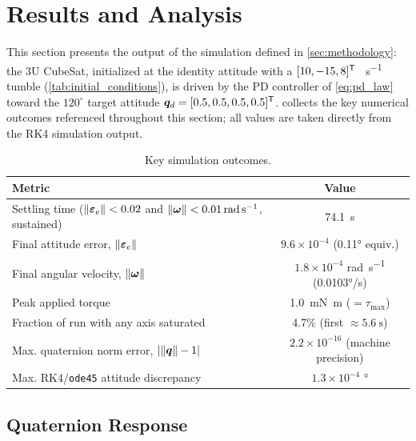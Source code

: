 \section{Results and Analysis}
\label{sec:results}

This section presents the output of the simulation defined in \cref{sec:methodology}: the 3U CubeSat, initialized at the identity attitude with a $[10,-15,8]^{\mathsf{T}}$ \si{\deg\per\second} tumble (\cref{tab:initial_conditions}), is driven by the PD controller of \cref{eq:pd_law} toward the $120^\circ$ target attitude $\bm{q}_d=[0.5,0.5,0.5,0.5]^{\mathsf{T}}$.  collects the key numerical outcomes referenced throughout this section; all values are taken directly from the RK4 simulation output.

\begin{table}[htbp]
\centering
\caption{Key simulation outcomes.}
\label{tab:results_summary}
\begin{tabular}{@{}lc@{}}
\toprule
Metric & Value \\
\midrule
Settling time ($\left\lVert \bm{\varepsilon}_e \right\rVert<0.02$ and $\left\lVert \bm{\omega} \right\rVert<\SI{0.01}{\radian\per\second}$, sustained) & \SI{74.1}{\second} \\
Final attitude error, $\left\lVert \bm{\varepsilon}_e \right\rVert$ & $9.6\times10^{-4}$ (\ang{0.11} equiv.) \\
Final angular velocity, $\left\lVert \bm{\omega} \right\rVert$ & $1.8\times10^{-4}$ \si{\radian\per\second} (\ang{0.0103}/s) \\
Peak applied torque & \SI{1.0}{\milli\newton\meter} ($=\tau_{\max}$) \\
Fraction of run with any axis saturated & 4.7\% (first $\approx\SI{5.6}{\second}$) \\
Max. quaternion norm error, $\left|\left\lVert \bm{q} \right\rVert-1\right|$ & $2.2\times10^{-16}$ (machine precision) \\
Max. RK4/\texttt{ode45} attitude discrepancy & $1.3\times10^{-4}$ \si{\degree} \\
\bottomrule
\end{tabular}
\end{table}

\subsection{Quaternion Response}
\label{sec:results_quaternion}


